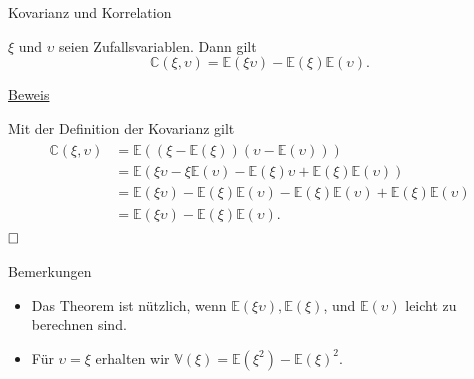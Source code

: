 \documentclass[
  8pt,
  ignorenonframetext,
]{beamer}
\providecommand{\tightlist}{%
  \setlength{\itemsep}{0pt}\setlength{\parskip}{0pt}}
\newcommand{\ups}{\upsilon}
\begin{document}
\begin{frame}{Kovarianz und Korrelation}
\protect\hypertarget{kovarianz-und-korrelation-3}{}
\begin{theorem}[Kovarianzverschiebungssatz]
\normalfont
\justifying
$\xi$ und $\ups$ seien Zufallsvariablen. Dann gilt
\begin{equation}
\mathbb{C}(\xi,\ups) = \mathbb{E}(\xi\ups) - \mathbb{E}(\xi)\mathbb{E}(\ups).
\end{equation}
\end{theorem}

\footnotesize

\underline{Beweis}

Mit der Definition der Kovarianz gilt \begin{align}
\begin{split}
\mathbb{C}(\xi,\ups)
& = \mathbb{E}\left((\xi - \mathbb{E}(\xi))(\ups - \mathbb{E}(\ups))\right)                                             \\
& = \mathbb{E}\left(\xi\ups - \xi\mathbb{E}(\ups) - \mathbb{E}(\xi)\ups  + \mathbb{E}(\xi) \mathbb{E}(\ups)\right)          \\
& = \mathbb{E}(\xi\ups) - \mathbb{E}(\xi)\mathbb{E}(\ups) - \mathbb{E}(\xi)\mathbb{E}(\ups) + \mathbb{E}(\xi) \mathbb{E}(\ups)  \\
& = \mathbb{E}(\xi\ups) - \mathbb{E}(\xi)\mathbb{E}(\ups).
\end{split}
\end{align} \(\hfill \Box\)

\footnotesize

Bemerkungen

\justifying

\begin{itemize}
\tightlist
\item
  Das Theorem ist nützlich, wenn
  \(\mathbb{E}(\xi\ups),\mathbb{E}(\xi)\), und \(\mathbb{E}(\ups)\)
  leicht zu berechnen sind.
\item
  Für \(\ups = \xi\) erhalten wir
  \(\mathbb{V}(\xi) = \mathbb{E}(\xi^2) - \mathbb{E}(\xi)^2\).
\end{itemize}
\end{frame}
\end{document}
